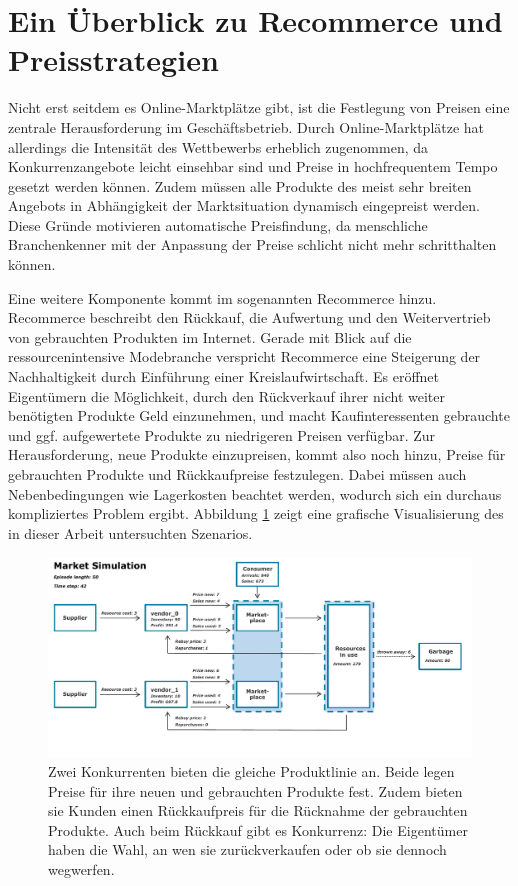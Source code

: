 \section{Ein Überblick zu Recommerce und Preisstrategien}
Nicht erst seitdem es Online-Marktplätze gibt, ist die Festlegung von Preisen eine zentrale Herausforderung im Geschäftsbetrieb.
Durch Online-Marktplätze hat allerdings die Intensität des Wettbewerbs erheblich zugenommen, da Konkurrenzangebote leicht einsehbar sind und Preise in hochfrequentem Tempo gesetzt werden können.
Zudem müssen alle Produkte des meist sehr breiten Angebots in Abhängigkeit der Marktsituation dynamisch eingepreist werden.
Diese Gründe motivieren automatische Preisfindung, da menschliche Branchenkenner mit der Anpassung der Preise schlicht nicht mehr schritthalten können.

Eine weitere Komponente kommt im sogenannten Recommerce hinzu.
Recommerce beschreibt den Rückkauf, die Aufwertung und den Weitervertrieb von gebrauchten Produkten im Internet. %
Gerade mit Blick auf die ressourcenintensive Modebranche verspricht Recommerce eine Steigerung der Nachhaltigkeit durch Einführung einer Kreislaufwirtschaft.
Es eröffnet Eigentümern die Möglichkeit, durch den Rückverkauf ihrer nicht weiter benötigten Produkte Geld einzunehmen, und macht Kaufinteressenten gebrauchte und ggf. aufgewertete Produkte zu niedrigeren Preisen verfügbar.
Zur Herausforderung, neue Produkte einzupreisen, kommt also noch hinzu, Preise für gebrauchten Produkte und Rückkaufpreise festzulegen.
Dabei müssen auch Nebenbedingungen wie Lagerkosten beachtet werden, wodurch sich ein durchaus kompliziertes Problem ergibt.
Abbildung \ref{graphic:MarketOverview} zeigt eine grafische Visualisierung des in dieser Arbeit untersuchten Szenarios.

\begin{figure}[htb]
	\centering
	\includegraphics[width=\textwidth]{introduction/MarketOverview_042.pdf}
	\caption{
		Zwei Konkurrenten bieten die gleiche Produktlinie an.
		Beide legen Preise für ihre neuen und gebrauchten Produkte fest.
		Zudem bieten sie Kunden einen Rückkaufpreis für die Rücknahme der gebrauchten Produkte.
		Auch beim Rückkauf gibt es Konkurrenz: Die Eigentümer haben die Wahl, an wen sie zurückverkaufen oder ob sie dennoch wegwerfen.
	}
	\label{graphic:MarketOverview}
\end{figure}

